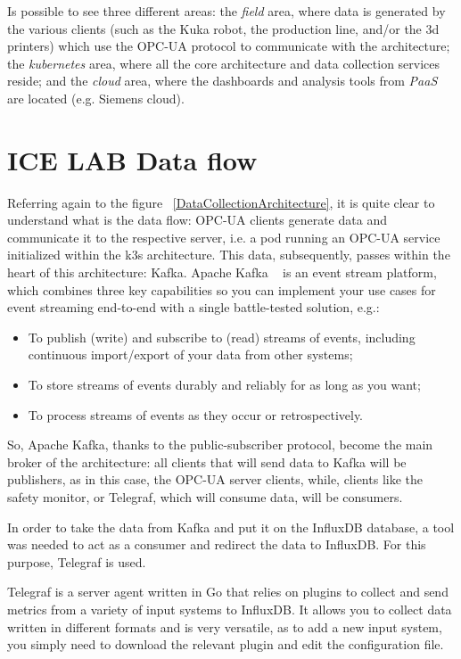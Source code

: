 \documentclass[]{IEEEtran}
\begin{document}
   Is possible to see three different areas: the \textit{field} area, where data is generated by the various clients (such as the Kuka robot, the production line, and/or the 3d printers) which use the OPC-UA protocol to communicate with the architecture; the \textit{kubernetes} area, where all the core architecture and data collection services reside; and the \textit{cloud} area, where the dashboards and analysis tools from \textit{PaaS} are located (e.g. Siemens cloud).

\section{ICE LAB Data flow}
Referring again to the figure ~\ref{DataCollectionArchitecture}, it is quite clear to understand what is the data flow:
OPC-UA clients generate data and communicate it to the respective server, i.e. a pod running an OPC-UA service initialized within the k3s architecture.
This data, subsequently, passes within the heart of this architecture: Kafka.
Apache Kafka ~\cite{kafkaOfficial} is an event stream platform, which combines three key capabilities so you can implement your use cases for event streaming end-to-end with a single battle-tested solution, e.g.:

\begin{itemize}
    \item To publish (write) and subscribe to (read) streams of events, including continuous import/export of your data from other systems;
    \item To store streams of events durably and reliably for as long as you want;
    \item To process streams of events as they occur or retrospectively.
\end{itemize}
So, Apache Kafka, thanks to the public-subscriber protocol, become the main broker of the architecture: all clients that will send data to Kafka will be publishers, as in this case, the OPC-UA server clients, while, clients like the safety monitor, or Telegraf, which will consume data, will be consumers.


In order to take the data from Kafka and put it on the InfluxDB database, a tool was needed to act as a consumer and redirect the data to InfluxDB. For this purpose, Telegraf is used.

Telegraf is a server agent written in Go that relies on plugins to collect and send metrics from a variety of input systems to InfluxDB. It allows you to collect data written in different formats and is very versatile, as to add a new input system, you simply need to download the relevant plugin and edit the configuration file.
\end{document}
